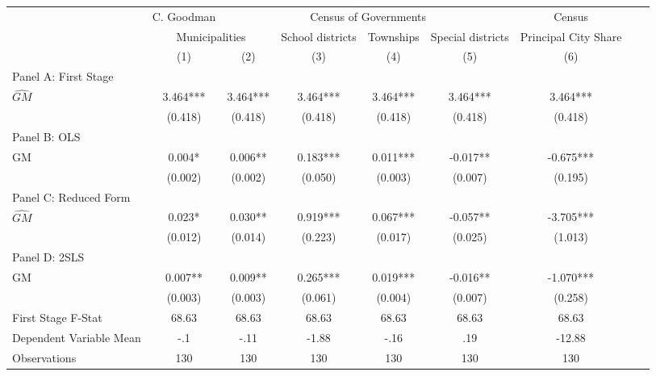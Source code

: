  \begin{tabular}{l*{8}{c}} \toprule
&\multicolumn{1}{c}{C. Goodman}&\multicolumn{4}{c}{Census of Governments}&\multicolumn{1}{c}{Census}\\\cmidrule(lr){2-2}\cmidrule(lr){3-6}\cmidrule(lr){7-7}
&\multicolumn{2}{c}{Municipalities}&\multicolumn{1}{c}{School districts}&\multicolumn{1}{c}{Townships}&\multicolumn{1}{c}{Special districts}&\multicolumn{1}{c}{Principal City Share}\\\cmidrule(lr){2-3}\cmidrule(lr){4-6}\cmidrule(lr){7-7}
&\multicolumn{1}{c}{(1)}&\multicolumn{1}{c}{(2)}&\multicolumn{1}{c}{(3)}&\multicolumn{1}{c}{(4)}&\multicolumn{1}{c}{(5)}&\multicolumn{1}{c}{(6)}\\
\cmidrule(lr){1-7}
\multicolumn{6}{l}{Panel A: First Stage}\\
\cmidrule(lr){1-7}
$\widehat{GM}$  &    3.464***&    3.464***&    3.464***&    3.464***&    3.464***&    3.464***\\
                &  (0.418)   &  (0.418)   &  (0.418)   &  (0.418)   &  (0.418)   &  (0.418)   \\
\cmidrule(lr){1-7}
\multicolumn{6}{l}{Panel B: OLS}\\
\cmidrule(lr){1-7}
GM              &    0.004*  &    0.006** &    0.183***&    0.011***&   -0.017** &   -0.675***\\
                &  (0.002)   &  (0.002)   &  (0.050)   &  (0.003)   &  (0.007)   &  (0.195)   \\
\cmidrule(lr){1-7}
\multicolumn{6}{l}{Panel C: Reduced Form}\\
\cmidrule(lr){1-7}
$\widehat{GM}$  &    0.023*  &    0.030** &    0.919***&    0.067***&   -0.057** &   -3.705***\\
                &  (0.012)   &  (0.014)   &  (0.223)   &  (0.017)   &  (0.025)   &  (1.013)   \\
\cmidrule(lr){1-7}
\multicolumn{6}{l}{Panel D: 2SLS}\\
\cmidrule(lr){1-7}
GM              &    0.007** &    0.009** &    0.265***&    0.019***&   -0.016** &   -1.070***\\
                &  (0.003)   &  (0.003)   &  (0.061)   &  (0.004)   &  (0.007)   &  (0.258)   \\
\midrule
First Stage F-Stat&    68.63   &    68.63   &    68.63   &    68.63   &    68.63   &    68.63   \\
Dependent Variable Mean&      -.1   &     -.11   &    -1.88   &     -.16   &      .19   &   -12.88   \\
Observations    &      130   &      130   &      130   &      130   &      130   &      130   \\
       \bottomrule \end{tabular}
